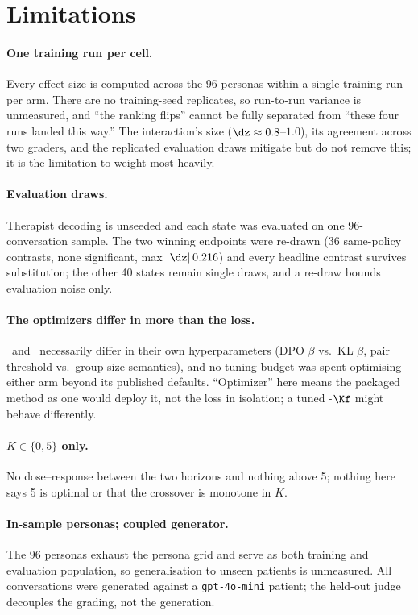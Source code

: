 \section*{Limitations}
\label{sec:limitations}

\paragraph{One training run per cell.} Every effect size is computed across the 96 personas
within a single training run per arm. There are no training-seed replicates, so run-to-run
variance is unmeasured, and ``the ranking flips'' cannot be fully separated from ``these four
runs landed this way.'' The interaction's size ($\dz \approx 0.8$--$1.0$), its agreement across
two graders, and the replicated evaluation draws mitigate but do not remove this; it is the
limitation to weight most heavily.

\paragraph{Evaluation draws.} Therapist decoding is unseeded and each state was evaluated on one
96-conversation sample. The two winning endpoints were re-drawn (36 same-policy contrasts, none
significant, max $|\dz|\,0.216$) and every headline contrast survives substitution; the other 40
states remain single draws, and a re-draw bounds evaluation noise only.

\paragraph{The optimizers differ in more than the loss.} \PTO\ and \GRPO\ necessarily differ in
their own hyperparameters (DPO $\beta$ vs.\ KL $\beta$, pair threshold vs.\ group size
semantics), and no tuning budget was spent optimising either arm beyond its published defaults.
``Optimizer'' here means the packaged method as one would deploy it, not the loss in isolation;
a tuned \PTO-$\Kf$ might behave differently.

\paragraph{$K \in \{0, 5\}$ only.} No dose--response between the two horizons and nothing above
5; nothing here says 5 is optimal or that the crossover is monotone in $K$.

\paragraph{In-sample personas; coupled generator.} The 96 personas exhaust the persona grid and
serve as both training and evaluation population, so generalisation to unseen patients is
unmeasured. All conversations were generated against a \texttt{gpt-4o-mini} patient; the held-out
judge decouples the grading, not the generation.

